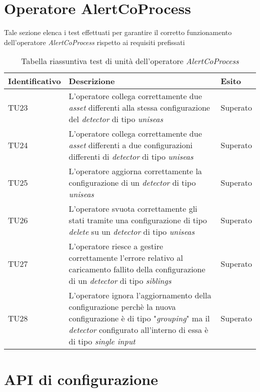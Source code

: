 \section{Operatore AlertCoProcess}
Tale sezione elenca i test effettuati per garantire il corretto funzionamento dell'operatore \textit{AlertCoProcess} rispetto ai requisiti prefissati

{
\centering
\begin{longtable}{L{3cm} L{8.5cm} L{2cm}}
\caption{Tabella riassuntiva test di unità dell'operatore \textit{AlertCoProcess}}\\
\textbf{Identificativo} &
\textbf{Descrizione}&
\textbf{Esito}\\
\endhead
\hline

TU23 & L'operatore collega correttamente due \textit{asset} differenti alla stessa configurazione del \textit{detector} di tipo \textit{uniseas} & Superato\\
\hline
TU24 & L'operatore collega correttamente due \textit{asset} differenti a due configurazioni differenti di \textit{detector} di tipo \textit{uniseas} & Superato \\
\hline
TU25 &  L'operatore aggiorna correttamente la configurazione di un \textit{detector} di tipo \textit{uniseas} & Superato\\
\hline
TU26 & L'operatore svuota correttamente gli stati tramite una configurazione di tipo \textit{delete} su un \textit{detector} di tipo \textit{uniseas} & Superato \\
\hline
TU27 & L'operatore riesce a gestire correttamente l'errore relativo al caricamento fallito della configurazione di un \textit{detector} di tipo \textit{siblings} & Superato\\
\hline
TU28 & L'operatore ignora l'aggiornamento della configurazione perchè la nuova configurazione è di tipo "\textit{grouping}" ma il \textit{detector} configurato all'interno di essa è di tipo \textit{single input} & Superato \\
\hline
\end{longtable}
}

\section{API di configurazione}


